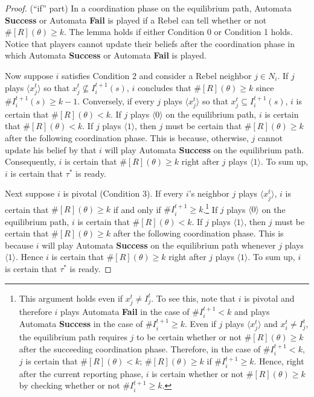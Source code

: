 \documentclass[12pt,letter]{article}
\theoremstyle{definition}
\theoremstyle{definition}
\theoremstyle{remark}
\theoremstyle{claim}
\begin{document}
\begin{proof}(``if'' part)
In a coordination phase on the equilibrium path, Automata \textbf{Success} or Automata \textbf{Fail} is played if a Rebel can tell whether or not $\#[R](\theta)\geq k$. The lemma holds if either Condition 0 or Condition 1 holds. Notice that players cannot update their beliefs after the coordination phase in which Automata \textbf{Success} or Automata \textbf{Fail} is played.

Now suppose $i$ satisfies Condition 2 and consider a Rebel neighbor $j\in N_i$. If $j$ plays $\langle x^t_j \rangle$ so that $x^t_j\not\subseteq I^{t+1}_i(s)$, $i$ concludes that $\#[R](\theta)\geq k$ since $\#I^{t+1}_i(s)\geq k-1$. Conversely, if every  $j$ plays $\langle x^t_j \rangle$ so that $x^t_j\subseteq I^{t+1}_i(s)$, $i$ is certain that $\#[R](\theta)<k$. If $j$ plays $\langle 0 \rangle$ on the equilibrium path, $i$ is certain that $\#[R](\theta)<k$. If $j$ plays $\langle 1 \rangle$, then $j$ must be certain that $\#[R](\theta)\geq k$ after the following coordination phase. This is because, otherwise, $j$ cannot update his belief by that $i$ will play Automata \textbf{Success} on the equilibrium path. Consequently, $i$ is certain that $\#[R](\theta)\geq k$ right after $j$ plays $\langle 1 \rangle$. To sum up, $i$ is certain that $\tau^{*}$ is ready.

Next suppose $i$ is pivotal (Condition 3). If every $i$'s neighbor $j$ plays $\langle x^t_j \rangle$, $i$ is certain that $\#[R](\theta)\geq k$ if and only if $\#I^{t+1}_i\geq k$.\footnote{This argument holds even if $x^t_j\neq I^t_j$. To see this, note that $i$ is pivotal and therefore $i$ plays Automata \textbf{Fail} in the case of $\#I^{t+1}_i<k$ and plays Automata \textbf{Success} in the case of $\#I^{t+1}_i\geq k$. Even if $j$ plays $\langle x^t_j \rangle$ and $x^t_i\neq I^t_j$, the equilibrium path requires $j$ to be certain whether or not $\#[R](\theta)\geq k$ after the succeeding coordination phase. Therefore, in the case of $\#I^{t+1}_i<k$, $j$ is certain that $\#[R](\theta)<k$; $\#[R](\theta)\geq k$ if $\#I^{t+1}_i\geq k$. Hence, right after the current reporting phase, $i$ is certain whether or not $\#[R](\theta)\geq k$ by checking whether or not $\#I^{t+1}_i\geq k$.} If $j$ plays $\langle 0 \rangle$ on the equilibrium path, $i$ is certain that $\#[R](\theta)<k$. If $j$ plays $\langle 1 \rangle$, then $j$ must be certain that $\#[R](\theta)\geq k$ after the following coordination phase. This is because $i$ will play Automata \textbf{Success} on the equilibrium path whenever $j$ plays $\langle 1 \rangle$. Hence $i$ is certain that $\#[R](\theta)\geq k$ right after $j$ plays $\langle 1 \rangle$. To sum up, $i$ is certain that $\tau^{*}$ is ready.

\end{proof}
\end{document}
